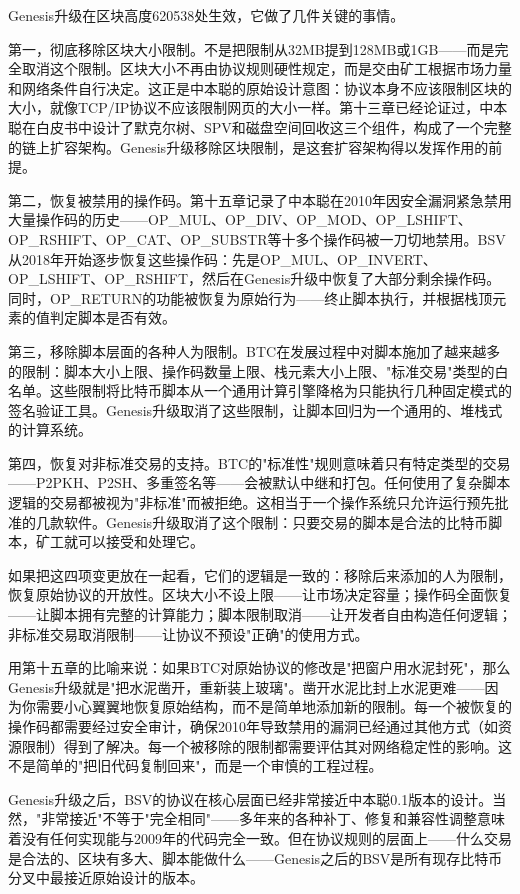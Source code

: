 \documentclass[a4paper,12pt,openany]{ctexbook}
\begin{document}
Genesis升级在区块高度620538处生效，它做了几件关键的事情。

第一，彻底移除区块大小限制。不是把限制从32MB提到128MB或1GB——而是完全取消这个限制。区块大小不再由协议规则硬性规定，而是交由矿工根据市场力量和网络条件自行决定。这正是中本聪的原始设计意图：协议本身不应该限制区块的大小，就像TCP/IP协议不应该限制网页的大小一样。第十三章已经论证过，中本聪在白皮书中设计了默克尔树、SPV和磁盘空间回收这三个组件，构成了一个完整的链上扩容架构。Genesis升级移除区块限制，是这套扩容架构得以发挥作用的前提。

第二，恢复被禁用的操作码。第十五章记录了中本聪在2010年因安全漏洞紧急禁用大量操作码的历史——OP\_MUL、OP\_DIV、OP\_MOD、OP\_LSHIFT、OP\_RSHIFT、OP\_CAT、OP\_SUBSTR等十多个操作码被一刀切地禁用。BSV从2018年开始逐步恢复这些操作码：先是OP\_MUL、OP\_INVERT、OP\_LSHIFT、OP\_RSHIFT，然后在Genesis升级中恢复了大部分剩余操作码。同时，OP\_RETURN的功能被恢复为原始行为——终止脚本执行，并根据栈顶元素的值判定脚本是否有效。

第三，移除脚本层面的各种人为限制。BTC在发展过程中对脚本施加了越来越多的限制：脚本大小上限、操作码数量上限、栈元素大小上限、"标准交易"类型的白名单。这些限制将比特币脚本从一个通用计算引擎降格为只能执行几种固定模式的签名验证工具。Genesis升级取消了这些限制，让脚本回归为一个通用的、堆栈式的计算系统。

第四，恢复对非标准交易的支持。BTC的"标准性"规则意味着只有特定类型的交易——P2PKH、P2SH、多重签名等——会被默认中继和打包。任何使用了复杂脚本逻辑的交易都被视为"非标准"而被拒绝。这相当于一个操作系统只允许运行预先批准的几款软件。Genesis升级取消了这个限制：只要交易的脚本是合法的比特币脚本，矿工就可以接受和处理它。

如果把这四项变更放在一起看，它们的逻辑是一致的：移除后来添加的人为限制，恢复原始协议的开放性。区块大小不设上限——让市场决定容量；操作码全面恢复——让脚本拥有完整的计算能力；脚本限制取消——让开发者自由构造任何逻辑；非标准交易取消限制——让协议不预设"正确"的使用方式。

用第十五章的比喻来说：如果BTC对原始协议的修改是"把窗户用水泥封死"，那么Genesis升级就是"把水泥凿开，重新装上玻璃"。凿开水泥比封上水泥更难——因为你需要小心翼翼地恢复原始结构，而不是简单地添加新的限制。每一个被恢复的操作码都需要经过安全审计，确保2010年导致禁用的漏洞已经通过其他方式（如资源限制）得到了解决。每一个被移除的限制都需要评估其对网络稳定性的影响。这不是简单的"把旧代码复制回来"，而是一个审慎的工程过程。

Genesis升级之后，BSV的协议在核心层面已经非常接近中本聪0.1版本的设计。当然，"非常接近"不等于"完全相同"——多年来的各种补丁、修复和兼容性调整意味着没有任何实现能与2009年的代码完全一致。但在协议规则的层面上——什么交易是合法的、区块有多大、脚本能做什么——Genesis之后的BSV是所有现存比特币分叉中最接近原始设计的版本。
\end{document}

